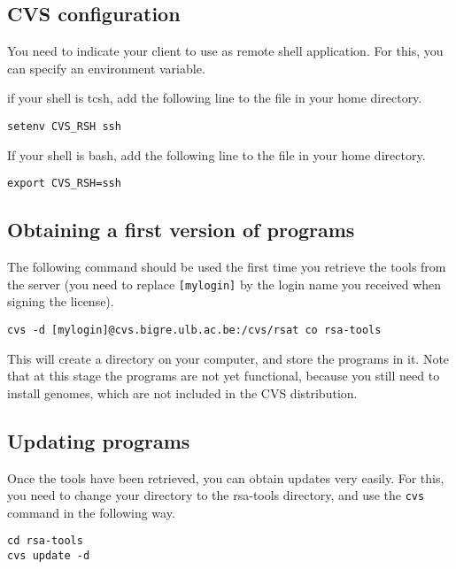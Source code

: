 \documentclass[12pt,a4paper, oneside]{scrreprt} %
\begin{document}
\subsection{CVS configuration}

You need to indicate your  client to use 
as remote shell application. For this, you can specify an environment
variable.

if your shell is tcsh, add the following line to the 
file in your home directory.

\begin{lstlisting}
setenv CVS_RSH ssh
\end{lstlisting}


If your shell is bash, add the following line to the 
file in your home directory.

\begin{lstlisting}
export CVS_RSH=ssh
\end{lstlisting}



\subsection{Obtaining a first version of \RSAT programs}

The following command should be used the first time you retrieve the
tools from the server (you need to replace \texttt{[mylogin]} by the
login name you received when signing the \RSAT license).

\begin{lstlisting}
cvs -d [mylogin]@cvs.bigre.ulb.ac.be:/cvs/rsat co rsa-tools
\end{lstlisting}


This will create a directory  on your computer, and
store the programs in it. Note that at this stage the programs are not
yet functional, because you still need to install genomes, which are
not included in the CVS distribution.

\subsection{Updating \RSAT programs}

Once the tools have been retrieved, you can obtain updates very
easily. For this, you need to change your directory to the rsa-tools
directory, and use the \texttt{cvs} command in the following way.

\begin{lstlisting}
cd rsa-tools
cvs update -d
\end{lstlisting}
\end{document}
